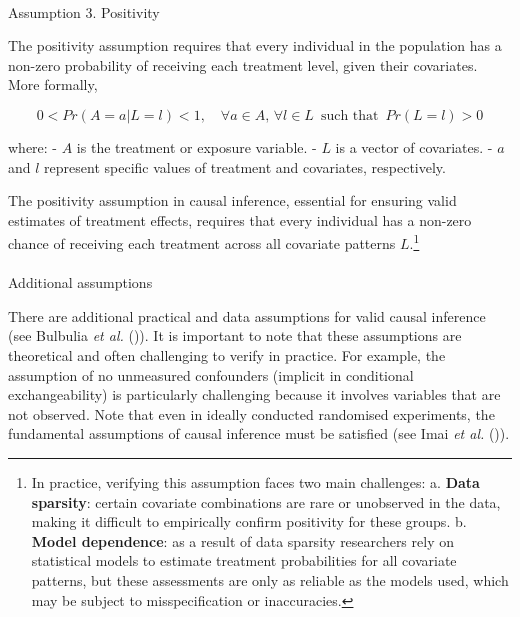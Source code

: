 \documentclass[
  single column]{article}
\makeatletter
\let\oldparagraph\paragraph
\renewcommand{\paragraph}{
    \@ifstar
      \xxxParagraphStar
      \xxxParagraphNoStar
  }
\newcommand{\xxxParagraphStar}[1]{\oldparagraph*{#1}\mbox{}}
\newcommand{\xxxParagraphNoStar}[1]{\oldparagraph{#1}\mbox{}}
\makeatother
\begin{document}
\paragraph{Assumption 3. Positivity}\label{assumption-3.-positivity}

The positivity assumption requires that every individual in the
population has a non-zero probability of receiving each treatment level,
given their covariates. More formally,

\[
0 < Pr(A = a | L = l) < 1, \quad \forall a \in A, \, \forall l \in L \, \text{ such that } \, Pr(L = l) > 0
\]

where: - \(A\) is the treatment or exposure variable. - \(L\) is a
vector of covariates. - \(a\) and \(l\) represent specific values of
treatment and covariates, respectively.

The positivity assumption in causal inference, essential for ensuring
valid estimates of treatment effects, requires that every individual has
a non-zero chance of receiving each treatment across all covariate
patterns \(L\).\footnote{In practice, verifying this assumption faces
  two main challenges: a. \textbf{Data sparsity}: certain covariate
  combinations are rare or unobserved in the data, making it difficult
  to empirically confirm positivity for these groups. b. \textbf{Model
  dependence}: as a result of data sparsity researchers rely on
  statistical models to estimate treatment probabilities for all
  covariate patterns, but these assessments are only as reliable as the
  models used, which may be subject to misspecification or inaccuracies.}

\paragraph{Additional assumptions}\label{additional-assumptions}

There are additional practical and data assumptions for valid causal
inference (see Bulbulia \emph{et al.}
()). It is important to note that
these assumptions are theoretical and often challenging to verify in
practice. For example, the assumption of no unmeasured confounders
(implicit in conditional exchangeability) is particularly challenging
because it involves variables that are not observed. Note that even in
ideally conducted randomised experiments, the fundamental assumptions of
causal inference must be satisfied (see Imai \emph{et al.}
()).
\end{document}
